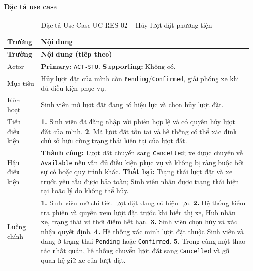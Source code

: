 \paragraph{Đặc tả use case}
\small
\begin{longtable}{|L{26mm}|L{118mm}|}
  \caption{Đặc tả Use Case UC-RES-02 -- Hủy lượt đặt phương tiện}\label{tab:spec-UC-RES-02}\\
  \hline
  \centering\arraybackslash\textbf{Trường} & \centering\arraybackslash\textbf{Nội dung}\\
  \hline
  \endfirsthead
  \hline
  \centering\arraybackslash\textbf{Trường} & \centering\arraybackslash\textbf{Nội dung (tiếp theo)}\\
  \hline
  \endhead
  Actor & \textbf{Primary:} \texttt{ACT-STU}. \textbf{Supporting:} Không có.\\\hline
  Mục tiêu & Hủy lượt đặt của mình còn \texttt{Pending}/\texttt{Confirmed}, giải phóng xe khi đủ điều kiện phục vụ.\\\hline
  Kích hoạt & Sinh viên mở lượt đặt đang có hiệu lực và chọn hủy lượt đặt.\\\hline
  Tiền điều kiện &
    \textbf{1.} Sinh viên đã đăng nhập với phiên hợp lệ và có quyền hủy lượt đặt của mình.\newline
    \textbf{2.} Mã lượt đặt tồn tại và hệ thống có thể xác định chủ sở hữu cùng trạng thái hiện tại của lượt đặt.\\\hline
  Hậu điều kiện &
    \textbf{Thành công:} Lượt đặt chuyển sang \texttt{Cancelled}; xe được chuyển về \texttt{Available} nếu vẫn đủ điều kiện phục vụ và không bị ràng buộc bởi sự cố hoặc quy trình khác.\newline
    \textbf{Thất bại:} Trạng thái lượt đặt và xe trước yêu cầu được bảo toàn; Sinh viên nhận được trạng thái hiện tại hoặc lý do không thể hủy.\\\hline
  Luồng chính &
    \textbf{1.} Sinh viên mở chi tiết lượt đặt đang có hiệu lực.\newline
    \textbf{2.} Hệ thống kiểm tra phiên và quyền xem lượt đặt trước khi hiển thị xe, Hub nhận xe, trạng thái và thời điểm hết hạn.\newline
    \textbf{3.} Sinh viên chọn hủy và xác nhận quyết định.\newline
    \textbf{4.} Hệ thống xác minh lượt đặt thuộc Sinh viên và đang ở trạng thái \texttt{Pending} hoặc \texttt{Confirmed}.\newline
    \textbf{5.} Trong cùng một thao tác nhất quán, hệ thống chuyển lượt đặt sang \texttt{Cancelled} và gỡ quan hệ giữ xe của lượt đặt.\newline

\end{longtable}
